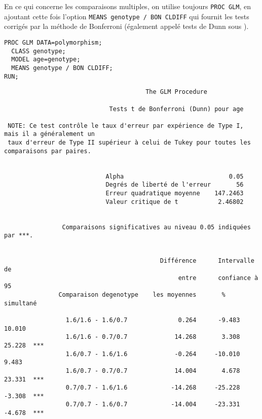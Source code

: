 En ce qui concerne les comparaisons multiples, on utilise toujours
\texttt{PROC GLM}, en ajoutant cette fois l'option 
\verb|MEANS genotype / BON CLDIFF| qui fournit les tests corrigés par la
méthode de Bonferroni (également appelé tests de Dunn sous \SAS). 
\begin{verbatim}
PROC GLM DATA=polymorphism; 
  CLASS genotype; 
  MODEL age=genotype;
  MEANS genotype / BON CLDIFF;
RUN;
\end{verbatim}

\begin{verbatim}
                                       The GLM Procedure

                             Tests t de Bonferroni (Dunn) pour age

 NOTE: Ce test contrôle le taux d'erreur par expérience de Type I, mais il a généralement un
 taux d'erreur de Type II supérieur à celui de Tukey pour toutes les comparaisons par paires.


                            Alpha                             0.05
                            Degrés de liberté de l'erreur       56
                            Erreur quadratique moyenne    147.2463
                            Valeur critique de t           2.46802


                Comparaisons significatives au niveau 0.05 indiquées par ***.


                                           Différence      Intervalle de
                                                entre      confiance à 95
               Comparaison degenotype    les moyennes       % simultané

                 1.6/1.6 - 1.6/0.7              0.264      -9.483   10.010
                 1.6/1.6 - 0.7/0.7             14.268       3.308   25.228  ***
                 1.6/0.7 - 1.6/1.6             -0.264     -10.010    9.483
                 1.6/0.7 - 0.7/0.7             14.004       4.678   23.331  ***
                 0.7/0.7 - 1.6/1.6            -14.268     -25.228   -3.308  ***
                 0.7/0.7 - 1.6/0.7            -14.004     -23.331   -4.678  ***
\end{verbatim}

